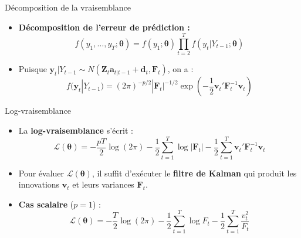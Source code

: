 \documentclass[11pt,aspectratio=169]{beamer}
\begin{document}
\begin{frame}{Décomposition de la vraisemblance}

\begin{itemize}

\item \textbf{Décomposition de l'erreur de prédiction :}
  \[
  f(y_1, \ldots, y_T; \bm{\theta}) = f(y_1; \bm{\theta}) \prod_{t=2}^{T} f(y_t | Y_{t-1}; \bm{\theta})
  \]\newline

\item Puisque $\bm{y}_t | Y_{t-1} \sim N(\bm{Z}_t \bm{a}_{t|t-1} + \bm{d}_t, \bm{F}_t)$, on a :
  \[
  f(\bm{y}_t | Y_{t-1}) = (2\pi)^{-p/2} |\bm{F}_t|^{-1/2} \exp\!\left( -\frac{1}{2} \bm{v}_t' \bm{F}_t^{-1} \bm{v}_t \right)
  \]

\end{itemize}

\end{frame}

\begin{frame}{Log-vraisemblance}

\begin{itemize}

\item La \textbf{log-vraisemblance} s'écrit :
  \[
  \boxed{\mathcal{L}(\bm{\theta}) = -\frac{pT}{2} \log(2\pi) - \frac{1}{2} \sum_{t=1}^{T} \log |\bm{F}_t| - \frac{1}{2} \sum_{t=1}^{T} \bm{v}_t' \bm{F}_t^{-1} \bm{v}_t}
  \]\newline

\item Pour évaluer $\mathcal{L}(\bm{\theta})$, il suffit d'exécuter le \textbf{filtre de Kalman} qui produit les innovations $\bm{v}_t$ et leurs variances $\bm{F}_t$.\newline

\item \textbf{Cas scalaire} ($p=1$) :
  \[
  \mathcal{L}(\bm{\theta}) = -\frac{T}{2} \log(2\pi) - \frac{1}{2} \sum_{t=1}^{T} \log F_t - \frac{1}{2} \sum_{t=1}^{T} \frac{v_t^2}{F_t}
  \]

\end{itemize}

\end{frame}
\end{document}
